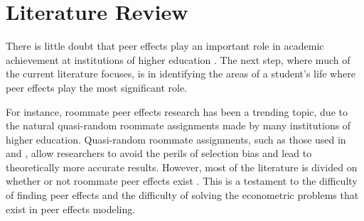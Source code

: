 \documentclass[12pt,letterpaper,english,fleqn]{article}
\begin{document}

\section{Literature Review}\label{litreview}

There is little doubt that peer effects play an important role in academic achievement at institutions of higher education \citep{smith2015new,luppino2015college,ost2010role}. 
The next step, where much of the current literature focuses, is in identifying the areas of a student's life where peer effects play the most significant role. 

For instance, roommate peer effects research has been a trending topic, due to the natural quasi-random roommate assignments made by many institutions of higher education.
Quasi-random roommate assignments, such as those used in \citet{griffith2014peer} and \citet{zimmerman2003peer}, allow researchers to avoid the perils of selection bias and lead to theoretically more accurate results.
However, most of the literature is divided on whether or not roommate peer effects exist \citep{griffith2014peer,zimmerman2003peer,sacerdote2000peer,foster2006s,mcewan2006roommate}.
This is a testament to the difficulty of finding peer effects and the difficulty of solving the econometric problems that exist in peer effects modeling.
\end{document}
